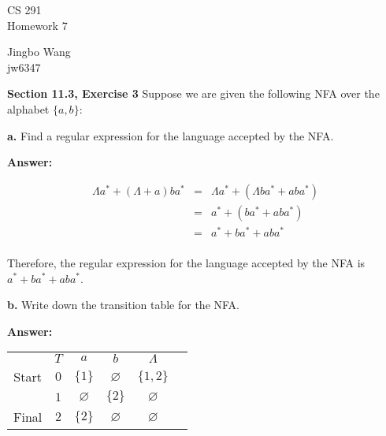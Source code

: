\documentclass[12pt]{article}
\begin{document}
\begin{center}
{\large CS 291}\\
Homework 7
\end{center}

\begin{flushright}
Jingbo Wang\\
jw6347
\end{flushright}
\textbf{Section 11.3, Exercise 3} Suppose we are given the following NFA over the alphabet $\{a, b\}$:


\textbf{a.} Find a regular expression for the language accepted by the NFA.

\textbf{Answer:}

\begin{center}
\begin{eqnarray*}
\Lambda a^* + (\Lambda + a)ba^*    
& = & \Lambda a^* + (\Lambda ba^* + aba^*) \\
& = & a^* + (ba^* + aba^*) \\
& = & a^* + ba^* + aba^* \\
\end{eqnarray*}
\end{center}

\begin{center}
Therefore, the regular expression for the language accepted by the NFA is $a^* + ba^* + aba^*$. \\
\end{center}

\textbf{b.} Write down the transition table for the NFA.

\textbf{Answer:} 

\begin{center}
\hspace{0.5cm}
\begin{tabular}{cc|cc cc}
           & $T$ & $a$           & $b$           & $\Lambda$     \\
     \cline{2-5}
     Start & $0$ & $\{1\}$       & $\varnothing$ & $\{1, 2\}$    \\
           & $1$ & $\varnothing$ & $\{2\}$       & $\varnothing$ \\
    Final  & $2$ & $\{2\}$       & $\varnothing$ & $\varnothing$ \\
\end{tabular}
\end{center}
\end{document}
